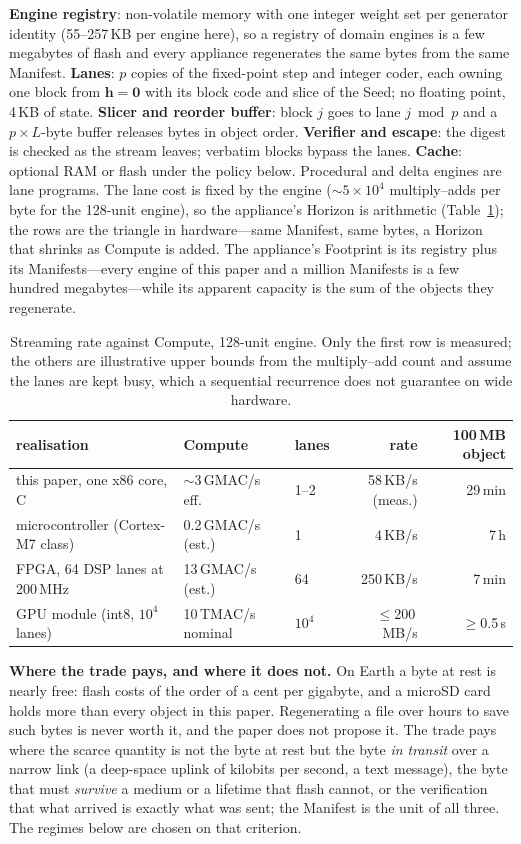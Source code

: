\documentclass[11pt,a4paper]{article}
\theoremstyle{definition}
\theoremstyle{plain}
\theoremstyle{remark}
\begin{document}
\textbf{Engine registry}: non-volatile memory with one integer weight set per generator identity
(55--257\,KB per engine here), so a registry of domain engines is a few megabytes of flash and
every appliance regenerates the same bytes from the same Manifest. \textbf{Lanes}: $p$ copies of
the fixed-point step and integer coder, each owning one block from $\mathbf{h}=\mathbf{0}$ with its
block code and slice of the Seed; no floating point, 4\,KB of state. \textbf{Slicer and reorder
buffer}: block $j$ goes to lane $j\bmod p$ and a $p\times L$-byte buffer releases bytes in object
order. \textbf{Verifier and escape}: the digest is checked as the stream leaves; verbatim blocks
bypass the lanes. \textbf{Cache}: optional RAM or flash under the policy below. Procedural and
delta engines are lane programs. The lane cost is fixed by the engine (${\sim}5\times10^{4}$
multiply--adds per byte for the 128-unit engine), so the appliance's Horizon is arithmetic
(Table~\ref{tab:device}); the rows are the triangle in hardware---same Manifest, same bytes, a
Horizon that shrinks as Compute is added. The appliance's Footprint is its registry plus its
Manifests---every engine of this paper and a million Manifests is a few hundred megabytes---while
its apparent capacity is the sum of the objects they regenerate.

\begin{table}[!htb]
\centering\small
\caption{Streaming rate against Compute, 128-unit engine. Only the first row is measured; the
others are illustrative upper bounds from the multiply--add count and assume the lanes are kept
busy, which a sequential recurrence does not guarantee on wide hardware.}
\label{tab:device}
\begin{tabular}{@{}lllrr@{}}
\toprule
realisation & Compute & lanes & rate & 100\,MB object \\
\midrule
this paper, one x86 core, C & ${\sim}3\,$GMAC/s eff. & 1--2 & 58\,KB/s (meas.) & 29\,min \\
microcontroller (Cortex-M7 class) & 0.2\,GMAC/s (est.) & 1 & 4\,KB/s & 7\,h \\
FPGA, 64 DSP lanes at 200\,MHz & 13\,GMAC/s (est.) & 64 & 250\,KB/s & 7\,min \\
GPU module (int8, $10^{4}$ lanes) & 10\,TMAC/s nominal & $10^{4}$ & $\le$200\,MB/s & $\ge$0.5\,s \\
\bottomrule
\end{tabular}
\end{table}

\textbf{Where the trade pays, and where it does not.} On Earth a byte at rest is nearly free:
flash costs of the order of a cent per gigabyte, and a microSD card holds more than every object
in this paper. Regenerating a file over hours to save such bytes is never worth it, and the
paper does not propose it. The trade pays where the scarce quantity is not the byte at rest but
the byte \emph{in transit} over a narrow link (a deep-space uplink of kilobits per second, a text
message), the byte that must \emph{survive} a medium or a lifetime that flash cannot, or the
verification that what arrived is exactly what was sent; the Manifest is the unit of all three.
The regimes below are chosen on that criterion.
\end{document}
